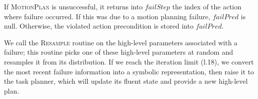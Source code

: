 If \textsc{MotionPlan} is unsuccessful, it returns into $failStep$ the index of the action where failure occurred.
If this was due to a motion planning failure, $failPred$ is null. Otherwise,
the violated action precondition is stored into $failPred$.

We call the \textsc{Resample} routine on the high-level parameters
associated with a failure; this routine picks one of these high-level parameters at random and
resamples it from its distribution. If we reach the iteration limit (l.18),
we convert the most recent failure information into a symbolic representation, then raise it
to the task planner, which will update its fluent state and provide a new
high-level plan.

